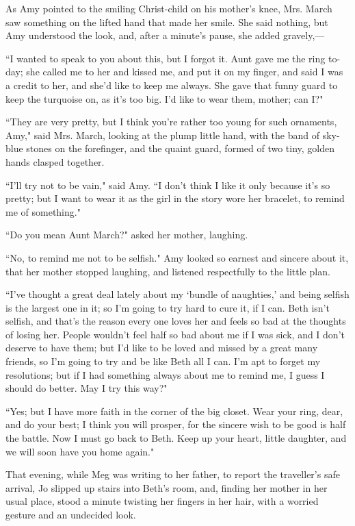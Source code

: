 As Amy pointed to the smiling Christ-child on his
mother's knee, Mrs. March saw something on the lifted
hand that made her smile. She said nothing, but Amy understood the look,
and, after a minute's pause, she added gravely,---

``I wanted to speak to you about this, but I forgot it. Aunt gave me the
ring to-day; she called me to her and kissed me, and put it on my
finger, and said I was a credit to her, and she'd like
to keep me always. She gave that funny guard to keep the turquoise on,
as it's too big. I'd like to wear them,
mother; can I?"

``They are very pretty, but I think you're rather too
young for such ornaments, Amy," said Mrs. March, looking at the plump
little hand, with the band of sky-blue stones on the forefinger, and the
quaint guard, formed of two tiny, golden hands clasped together.

``I'll try not to be vain," said Amy. ``I
don't think I like it only because it's
so pretty; but I want to wear it as the girl in the story wore her
bracelet, to remind me of something."

``Do you mean Aunt March?" asked her mother, laughing.

``No, to remind me not to be selfish." Amy looked so earnest and sincere
about it, that her mother stopped laughing, and listened respectfully to
the little plan.

``I've thought a great deal lately about my
`bundle of naughties,' and being
selfish is the largest one in it; so I'm going to try
hard to cure it, if I can. Beth isn't selfish, and
that's the reason every one loves her and feels so bad
at the thoughts of losing her. People wouldn't feel half
so bad about me if I was sick, and I don't deserve to
have them; but I'd like to be loved and missed by a
great many friends, so I'm going to try and be like Beth
all I can. I'm apt to forget my resolutions; but if I
had something always about me to remind me, I guess I should do better.
May I try this way?"

``Yes; but I have more faith in the corner of the big closet. Wear your
ring, dear, and do your best; I think you will prosper, for the sincere
wish to be good is half the battle. Now I must go back to Beth. Keep up
your heart, little daughter, and we will soon have you home again."

That evening, while Meg was writing to her father, to report the
traveller's safe arrival, Jo slipped up stairs into
Beth's room, and, finding her mother in her usual place,
stood a minute twisting her fingers in her hair, with a worried gesture
and an undecided look.

